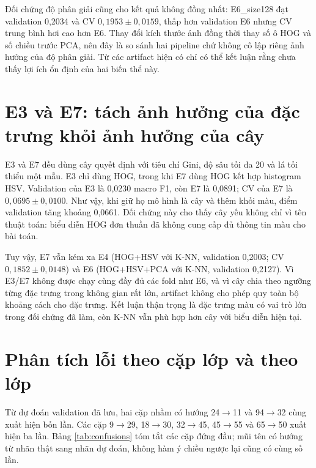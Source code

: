Đối chứng độ phân giải cũng cho kết quả không đồng nhất: E6\_size128 đạt validation 0,2034 và CV $0,1953\pm0,0159$, thấp hơn validation E6 nhưng CV trung bình hơi cao hơn E6. Thay đổi kích thước ảnh đồng thời thay số ô HOG và số chiều trước PCA, nên đây là so sánh hai pipeline chứ không cô lập riêng ảnh hưởng của độ phân giải. Từ các artifact hiện có chỉ có thể kết luận rằng chưa thấy lợi ích ổn định của hai biến thể này.

\section{E3 và E7: tách ảnh hưởng của đặc trưng khỏi ảnh hưởng của cây}
E3 và E7 đều dùng cây quyết định với tiêu chí Gini, độ sâu tối đa 20 và lá tối thiểu một mẫu. E3 chỉ dùng HOG, trong khi E7 dùng HOG kết hợp histogram HSV. Validation của E3 là 0,0230 macro F1, còn E7 là 0,0891; CV của E7 là $0,0695\pm0,0100$. Như vậy, khi giữ họ mô hình là cây và thêm khối màu, điểm validation tăng khoảng 0,0661. Đối chứng này cho thấy cây yếu không chỉ vì tên thuật toán: biểu diễn HOG đơn thuần đã không cung cấp đủ thông tin màu cho bài toán.

Tuy vậy, E7 vẫn kém xa E4 (HOG+HSV với K-NN, validation 0,2003; CV $0,1852\pm0,0148$) và E6 (HOG+HSV+PCA với K-NN, validation 0,2127). Vì E3/E7 không được chạy cùng đầy đủ các fold như E6, và vì cây chia theo ngưỡng từng đặc trưng trong không gian rất lớn, artifact không cho phép quy toàn bộ khoảng cách cho đặc trưng. Kết luận thận trọng là đặc trưng màu có vai trò lớn trong đối chứng đã làm, còn K-NN vẫn phù hợp hơn cây với biểu diễn hiện tại.

\section{Phân tích lỗi theo cặp lớp và theo lớp}
Từ dự đoán validation đã lưu, hai cặp nhầm có hướng 24$\rightarrow$11 và 94$\rightarrow$32 cùng xuất hiện bốn lần. Các cặp 9$\rightarrow$29, 18$\rightarrow$30, 32$\rightarrow$45, 45$\rightarrow$55 và 65$\rightarrow$50 xuất hiện ba lần. Bảng \ref{tab:confusions} tóm tắt các cặp đứng đầu; mũi tên có hướng từ nhãn thật sang nhãn dự đoán, không hàm ý chiều ngược lại cũng có cùng số lần.

